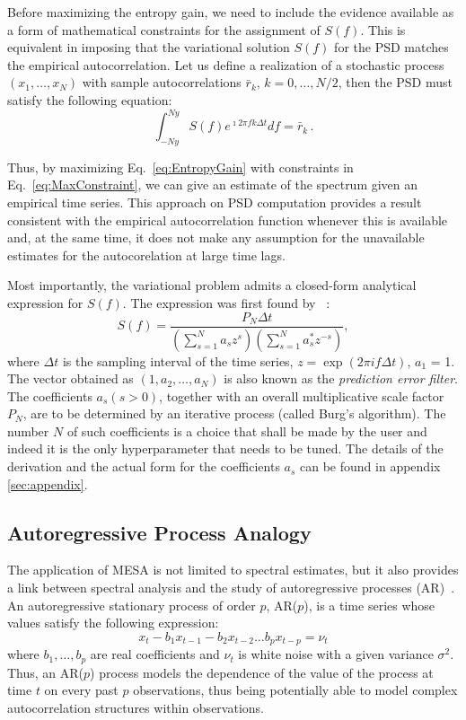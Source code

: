 \documentclass{aa}
\begin{document}
Before maximizing the entropy gain, we need to include the evidence available as a form of mathematical constraints for the assignment of $S(f)$.
This is equivalent in imposing that the variational solution $S(f)$ for the PSD matches the empirical autocorrelation.
Let us define a realization of a stochastic process $(x_1,\ldots,x_N)$ with sample autocorrelations $\bar r_k,\,k=0,\ldots, N/2$, then the PSD must satisfy the following equation:
\begin{equation}\label{eq:MaxConstraint}
\int_{-Ny}^{Ny} S(f) e^{\imath 2 \pi f k \Delta t} df = \bar r_{k}\,.
\end{equation}

Thus, by maximizing Eq.~\eqref{eq:EntropyGain} with constraints in Eq.~\eqref{eq:MaxConstraint}, we can give an estimate of the spectrum given an empirical time series.
This approach on PSD computation provides a result consistent with the empirical autocorrelation function whenever this is available and, at the same time, it does not make any assumption for the unavailable estimates for the autocorelation at large time lags.

Most importantly, the variational problem admits a closed-form analytical expression for $S(f)$.
The expression was first found by ~\citet{burg1975maximum}:
\begin{equation}\label{eq:MESApsd}
    S(f) = \frac{P_N \Delta t}{\left(\sum_{s=1}^N a_s z^s\right)\left(\sum_{s = 1}^N a^*_s z^{-s}\right)}, 
\end{equation}
where $\Delta t$ is the sampling interval of the time series, $z=\exp{(2\pi i f\Delta t)}$, $a_1$ = 1.
The vector obtained as $(1, a_2, \dots, a_N)$ is also known as the \textit{prediction error filter}.
The coefficients $a_s (s > 0)$, together with an overall multiplicative scale factor $P_N$, are to be determined by an iterative process (called Burg's algorithm). The number $N$ of such coefficients is a choice that shall be made by the user and indeed it is the only hyperparameter that needs to be tuned. The details of the derivation and the actual form for the coefficients $a_s$ can be found in appendix \ref{sec:appendix}.

\subsection{Autoregressive Process Analogy} \label{sec:autoregr}

The application of MESA is not limited to spectral estimates, but it also provides a link between spectral analysis and the study
of autoregressive processes (AR)~\citep{doi:10.1029/RG013i001p00183}.
An autoregressive stationary process of order $p$, AR($p$), is a time series whose values satisfy the following expression: 
\begin{equation} \label{eq:AR_p}
    x_t - b_1 x_{t-1} - b_2 x_{t-2} \dots b_p x_{t - p} = \nu_t
\end{equation}
where $b_1, \ldots, b_p$ are real coefficients and $\nu_t$ is white noise with a given variance $\sigma^2$.
Thus, an AR($p$) process models the dependence of the value of the process at time $t$ on every past $p$ observations, 
thus being potentially able to model complex autocorrelation structures within observations.
\end{document}
